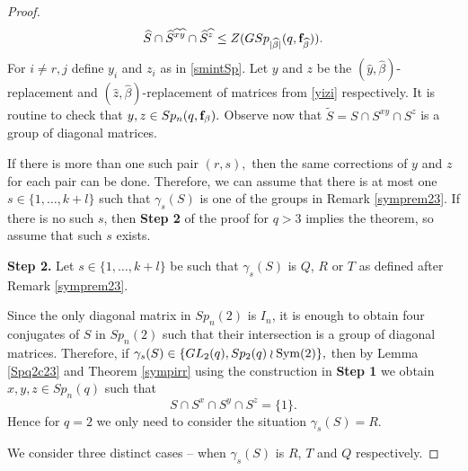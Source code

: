 \begin{proof}
$$\widehat{S} \cap \widehat{S}^{\widehat{x} \widehat{y}} \cap \widehat{S}^{\widehat{z}}\le Z(GSp_{|\widehat{\beta}|}(q, {\bf f}_{\widehat{\beta}})).$$
 For $i \ne r,j$ define $y_i$ and $z_i$ as in \eqref{smintSp}. Let $y$ and $z$ be the $(\widehat{y}, \widehat{\beta})$-{replacement} and $(\widehat{z}, \widehat{\beta})$-{replacement} of  matrices from \eqref{yizi} respectively. It is routine to check that $y,z \in Sp_n(q,{\bf f}_{\beta}).$ Observe now that 
$\tilde{S}= S \cap S^{xy} \cap S^{z}$ is a group of diagonal matrices.

If there is more than one such pair $(r,s),$ then the same corrections of $y$ and $z$ for each pair can be done. Therefore, we can assume that there is at most one $s \in \{1, \ldots, k+l\}$ such that $\gamma_s(S)$ is one of the groups in Remark \ref{symprem23}. If there is no such $s$, then {\bf Step 2} of the proof for $q>3$ implies the theorem, so assume that such $s$ exists.

\medskip

{\bf Step 2.} Let $s \in \{1, \ldots, k+l\}$ be such that $\gamma_s(S)$ is $Q$, $R$ or $T$ as defined after Remark \ref{symprem23}. 

\medskip Since the only diagonal matrix in $Sp_n(2)$ is $I_n$, it is enough to obtain four conjugates of $S$ in $Sp_n(2)$ such that their intersection is a group of diagonal matrices. Therefore, if $\gamma_s(S) \in \{GL_2(q), Sp_2(q) \wr \mathrm{Sym}(2)\},$ then by Lemma  \ref{Spq2c23} and Theorem \ref{sympirr}
 using the construction in {\bf Step 1} we obtain $x,y,z \in Sp_n(q)$ such that 
$$S \cap S^x \cap S^y \cap S^z =\{1\}.$$
Hence for $q=2$ we only need to consider the situation $\gamma_s(S)=R$. 

 We consider three distinct cases -- when  $\gamma_s(S)$ is $R$, $T$ and $Q$ respectively.

\medskip


\end{proof}

